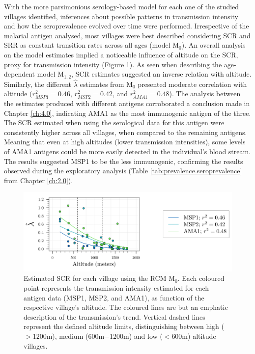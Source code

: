With the more parsimonious serology-based model for each one of the studied villages identified, inferences about possible patterns in transmission intensity and how the seroprevalence evolved over time were performed.
Irrespective of the malarial antigen analysed, most villages were best described considering SCR and SRR as constant transition rates across all ages (model M$_0$).
An overall analysis on the model estimates implied a noticeable influence of altitude on the SCR, proxy for transmission intensity (Figure \ref{fig:M0.SCR.altitude}).
As seen when describing the age-dependent model M$_{1,2}$, SCR estimates suggested an inverse relation with altitude.
Similarly, the different $ \widehat{\lambda}$ estimates from M$_0$ presented moderate correlation with altitude ($r^2_{MSP1}=0.46$, $r^2_{MSP2}=0.42$, and $r^2_{AMA1}=0.48$).
The analysis between the estimates produced with different antigens corroborated a conclusion made in Chapter \ref{ch:4.0}, indicating AMA1 as the most immunogenic antigen of the three.
The SCR estimated when using the serological data for this antigen were consistently higher across all villages, when compared to the remaining antigens.
Meaning that even at high altitudes (lower transmission intensities), some levels of AMA1 antigens could be more easily detected in the individual's blood stream.
The results suggested MSP1 to be the less immunogenic, confirming the results observed during the exploratory analysis (Table \ref{tab:prevalence.seroprevalence} from Chapter \ref{ch:2.0}).

\begin{figure}[ht!]
\center
\begin{adjustbox}{width=\linewidth}
\includegraphics[width=\columnwidth]{images/M0_vs_altitude.pdf}
\end{adjustbox}
\caption[Dependency between altitude and SCR estimates]{Estimated SCR for each village using the RCM M$_0$. Each coloured point represents the transmission intensity estimated for each antigen data (MSP1, MSP2, and AMA1), as function of the respective village's altitude. The coloured lines are but an emphatic description of the transmission's trend. Vertical dashed lines represent the defined altitude limits, distinguishing between high ($>$1200m), medium (600m$-$1200m) and low ($<$600m) altitude villages.}
\label{fig:M0.SCR.altitude}
\end{figure}

